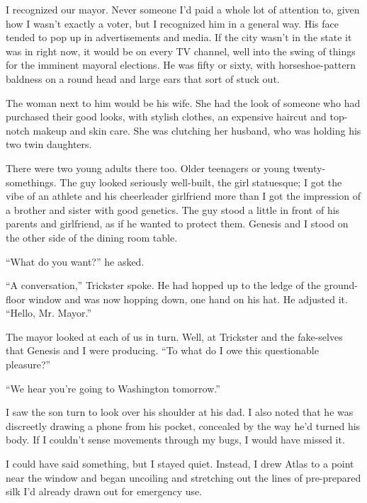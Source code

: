 I recognized our mayor.  Never someone I'd paid a whole lot of attention to, given how I wasn't exactly a voter, but I recognized him in a general way.  His face tended to pop up in advertisements and media.  If the city wasn't in the state it was in right now, it would be on every TV channel, well into the swing of things for the imminent mayoral elections.  He was fifty or sixty, with horseshoe-pattern baldness on a round head and large ears that sort of stuck out.



The woman next to him would be his wife.  She had the look of someone who had purchased their good looks, with stylish clothes, an expensive haircut and top-notch makeup and skin care.  She was clutching her husband, who was holding his two twin daughters.



There were two young adults there too.  Older teenagers or young twenty-somethings.  The guy looked seriously well-built, the girl statuesque;  I got the vibe of an athlete and his cheerleader girlfriend more than I got the impression of a brother and sister with good genetics.  The guy stood a little in front of his parents and girlfriend, as if he wanted to protect them.  Genesis and I stood on the other side of the dining room table.



``What do you want?'' he asked.



``A conversation,'' Trickster spoke.  He had hopped up to the ledge of the ground-floor window and was now hopping down, one hand on his hat.  He adjusted it.  ``Hello, Mr. Mayor.''



The mayor looked at each of us in turn.  Well, at Trickster and the fake-selves that Genesis and I were producing.  ``To what do I owe this questionable pleasure?''



``We hear you're going to Washington tomorrow.''



I saw the son turn to look over his shoulder at his dad.  I also noted that he was discreetly drawing a phone from his pocket, concealed by the way he'd turned his body.  If I couldn't sense movements through my bugs, I would have missed it.



I could have said something, but I stayed quiet.  Instead, I drew Atlas to a point near the window and began uncoiling and stretching out the lines of pre-prepared silk I'd already drawn out for emergency use.




